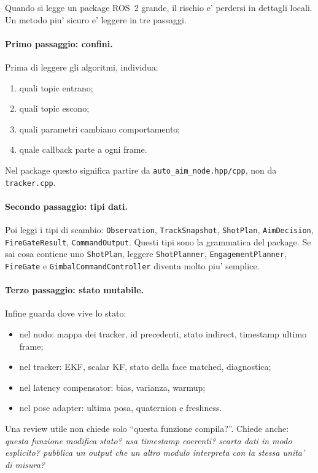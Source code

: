 \documentclass[11pt,a4paper]{article}
\newcommand{\code}[1]{\texttt{#1}}
\begin{document}
Quando si legge un package ROS~2 grande, il rischio e' perdersi in dettagli locali. Un metodo piu' sicuro e' leggere in tre passaggi.

\paragraph{Primo passaggio: confini.}
Prima di leggere gli algoritmi, individua:
\begin{enumerate}[leftmargin=1.4em]
  \item quali topic entrano;
  \item quali topic escono;
  \item quali parametri cambiano comportamento;
  \item quale callback parte a ogni frame.
\end{enumerate}
Nel package questo significa partire da \code{auto\_aim\_node.hpp/cpp}, non da \code{tracker.cpp}.

\paragraph{Secondo passaggio: tipi dati.}
Poi leggi i tipi di scambio: \code{Observation}, \code{TrackSnapshot}, \code{ShotPlan}, \code{AimDecision}, \code{FireGateResult}, \code{CommandOutput}. Questi tipi sono la grammatica del package. Se sai cosa contiene uno \code{ShotPlan}, leggere \code{ShotPlanner}, \code{EngagementPlanner}, \code{FireGate} e \code{GimbalCommandController} diventa molto piu' semplice.

\paragraph{Terzo passaggio: stato mutabile.}
Infine guarda dove vive lo stato:
\begin{itemize}[leftmargin=1.4em]
  \item nel nodo: mappa dei tracker, id precedenti, stato indirect, timestamp ultimo frame;
  \item nel tracker: EKF, scalar KF, stato della face matched, diagnostica;
  \item nel latency compensator: bias, varianza, warmup;
  \item nel pose adapter: ultima posa, quaternion e freshness.
\end{itemize}

Una review utile non chiede solo ``questa funzione compila?''. Chiede anche: \emph{questa funzione modifica stato? usa timestamp coerenti? scarta dati in modo esplicito? pubblica un output che un altro modulo interpreta con la stessa unita' di misura?}
\end{document}
